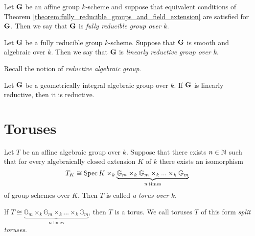 \begin{definition}
Let $\mathbf{G}$ be an affine group $k$-scheme and suppose that equivalent conditions of Theorem \ref{theorem:fully_reducible_groups_and_field_extension} are satisfied for $\mathbf{G}$. Then we say that $\mathbf{G}$ is \textit{fully reducible group over $k$}.
\end{definition}

\begin{definition}
Let $\mathbf{G}$ be a fully reducible group $k$-scheme. Suppose that $\mathbf{G}$ is smooth and algebraic over $k$. Then we say that $\mathbf{G}$ is \textit{linearly reductive group over $k$}.
\end{definition}
\noindent
Recall {\cite[6.46]{milne2017algebraic}} the notion of \textit{reductive algebraic group}.

\begin{theorem}
Let $\mathbf{G}$ be a geometrically integral algebraic group over $k$. If $\mathbf{G}$ is linearly reductive, then it is reductive.
\end{theorem}

\section{Toruses}

\begin{definition}
Let $T$ be an affine algebraic group over $k$. Suppose that there exists $n\in {\mathbb N}$ such that for every algebraically closed extension $K$ of $k$ there exists an isomorphism
$$T_K \cong  \mathrm{Spec}\, K \times_k \underbrace{\mathbb{G}_{m}\times_k \mathbb{G}_{m}\times_k ...\times_k \mathbb{G}_{m}}_{n\,\mathrm{times}} $$
of group schemes over $K$. Then $T$ is called \textit{a torus over $k$}.
\end{definition}

\begin{example}\label{example:split_torus}
If $T \cong \underbrace{\mathbb{G}_{m}\times_k \mathbb{G}_{m}\times_k ...\times_k \mathbb{G}_{m}}_{n\,\mathrm{times}}$, then $T$ is a torus. We call toruses $T$ of this form \textit{split toruses}.
\end{example}

